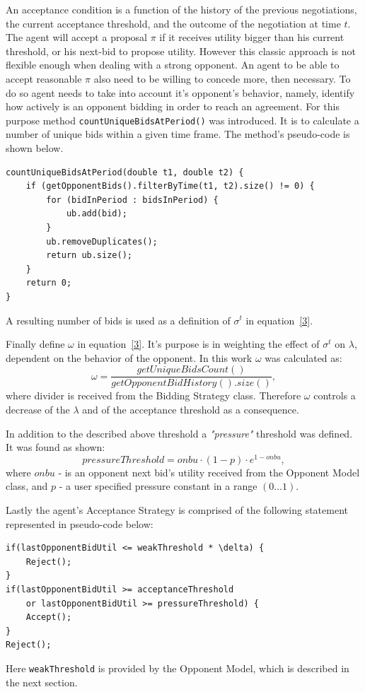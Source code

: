 \documentclass[html]{report}    %
\begin{document}
An acceptance condition is a function of the history of the previous negotiations, the current acceptance threshold, and the outcome of the negotiation at time $t$. The agent will accept a proposal $\pi$ if it receives utility bigger than his current threshold, or his next-bid to propose utility. However this classic approach is not flexible enough when dealing with a strong opponent. An agent to be able to accept reasonable $\pi$ also need to be willing to concede more, then necessary. To do so agent needs to take into account it's opponent's behavior, namely, identify how actively is an opponent bidding in order to reach an agreement. For this purpose method \texttt{countUniqueBidsAtPeriod()} was introduced. It is to calculate a number of unique bids within a given time frame. The method's pseudo-code is shown below.
\begin{verbatim}
countUniqueBidsAtPeriod(double t1, double t2) {
    if (getOpponentBids().filterByTime(t1, t2).size() != 0) {
        for (bidInPeriod : bidsInPeriod) {
            ub.add(bid);
        }
        ub.removeDuplicates();
        return ub.size();
    }
    return 0;
}
\end{verbatim}
A resulting number of bids is used as a definition of $\sigma^t$ in equation~\ref{3}.

Finally define $\omega$ in equation~\ref{3}. It's purpose is in weighting the effect of $\sigma^t$ on $\lambda$, dependent on the behavior of the opponent. In this work $\omega$ was calculated as:
\begin{dmath} \label{6}	
	\omega = \frac{getUniqueBidsCount()}{getOpponentBidHistory().size()},
\end{dmath}
where divider is received from the Bidding Strategy class. Therefore $\omega$ controls a decrease of the $\lambda$ and of the acceptance threshold as a consequence.

In addition to the described above threshold a \textit{"pressure"} threshold was defined. It was found as shown:
\begin{dmath} \label{7}	
	pressureThreshold = onbu\cdot(1 - p)\cdot e^{1 - onbu},
\end{dmath}
where $onbu$ - is an opponent next bid's utility received from the Opponent Model class, and $p$ - a user specified pressure constant in a range $(0\dots1)$.

Lastly the agent's Acceptance Strategy is comprised of the following statement represented in pseudo-code below:
\begin{verbatim}
if(lastOpponentBidUtil <= weakThreshold * \delta) {
    Reject();
}
if(lastOpponentBidUtil >= acceptanceThreshold
    or lastOpponentBidUtil >= pressureThreshold) {
    Accept();
}
Reject();
\end{verbatim}
Here \texttt{weakThreshold} is provided by the Opponent Model, which is described in the next section.
\end{document}
